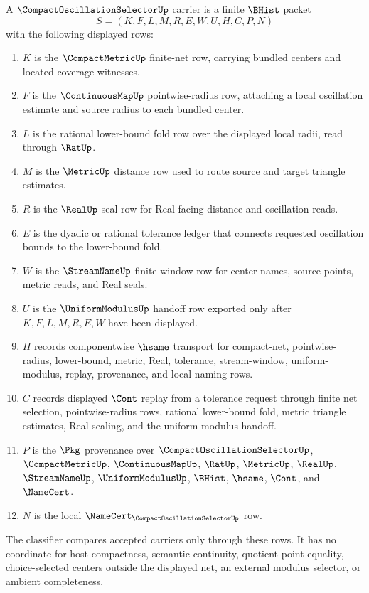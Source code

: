 \begin{definition}
\label{def:compact-oscillation-selector-carrier}
A $\CompactOscillationSelectorUp$ carrier is a finite $\BHist$ packet
$$
S=(K,F,L,M,R,E,W,U,H,C,P,N)
$$
with the following displayed rows:
\begin{enumerate}
\item $K$ is the $\CompactMetricUp$ finite-net row, carrying bundled centers and located coverage witnesses.
\item $F$ is the $\ContinuousMapUp$ pointwise-radius row, attaching a local oscillation estimate and source radius to each bundled center.
\item $L$ is the rational lower-bound fold row over the displayed local radii, read through $\RatUp$.
\item $M$ is the $\MetricUp$ distance row used to route source and target triangle estimates.
\item $R$ is the $\RealUp$ seal row for Real-facing distance and oscillation reads.
\item $E$ is the dyadic or rational tolerance ledger that connects requested oscillation bounds to the lower-bound fold.
\item $W$ is the $\StreamNameUp$ finite-window row for center names, source points, metric reads, and Real seals.
\item $U$ is the $\UniformModulusUp$ handoff row exported only after $K,F,L,M,R,E,W$ have been displayed.
\item $H$ records componentwise $\hsame$ transport for compact-net, pointwise-radius, lower-bound, metric, Real, tolerance, stream-window, uniform-modulus, replay, provenance, and local naming rows.
\item $C$ records displayed $\Cont$ replay from a tolerance request through finite net selection, pointwise-radius rows, rational lower-bound fold, metric triangle estimates, Real sealing, and the uniform-modulus handoff.
\item $P$ is the $\Pkg$ provenance over $\CompactOscillationSelectorUp$, $\CompactMetricUp$, $\ContinuousMapUp$, $\RatUp$, $\MetricUp$, $\RealUp$, $\StreamNameUp$, $\UniformModulusUp$, $\BHist$, $\hsame$, $\Cont$, and $\NameCert$.
\item $N$ is the local $\NameCert_{\CompactOscillationSelectorUp}$ row.
\end{enumerate}
The classifier compares accepted carriers only through these rows. It has no coordinate for host compactness, semantic continuity, quotient point equality, choice-selected centers outside the displayed net, an external modulus selector, or ambient completeness.
\end{definition}


